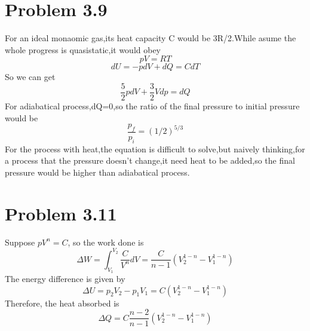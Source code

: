 \documentclass{article}
\begin{document}
 \section*{Problem 3.9}
 	For an ideal monaomic gas,its heat capacity C would be 3R/2.While asume the whole progress is quasistatic,it would obey
 	\begin{equation*}
		pV=RT
	\end{equation*}
	\begin{equation*}
		dU=-pdV+dQ=CdT
	\end{equation*}
	So we can get
	\begin{equation*}
		\frac{5}{2}pdV+\frac{3}{2}Vdp=dQ
	\end{equation*}
	For adiabatical process,dQ=0,so the ratio of the final pressure to initial pressure would be
	\begin{equation*}
		\frac{p_f}{p_i}=(1/2)^{5/3}
	\end{equation*}
	For the process with heat,the equation is difficult to solve,but naively thinking,for a process that the pressure doesn't change,it need heat to be added,so the final pressure would be higher than adiabatical process.
	
	
\section*{Problem 3.11}
	Suppose $pV^{n} = C$, so the work done is
	\begin{equation}
	\Delta W = \int^{V_{2}}_{V_{1}} \frac{C}{V^{n}} dV = \frac{C}{n-1} (V^{1-n}_{2}	 - V^{1-n}_{1})
	\end{equation}
	The energy difference is given by
	\begin{equation}
	\Delta U = p_{2}V_{2} - p_{1}V_{1} = C (V^{1-n}_{2} - V^{1-n}_{1})
	\end{equation}
	Therefore, the heat absorbed is
	\begin{equation}
	\Delta Q =  C\frac{n-2}{n-1} (V^{1-n}_{2} - V^{1-n}_{1})
	\end{equation}
\end{document}
